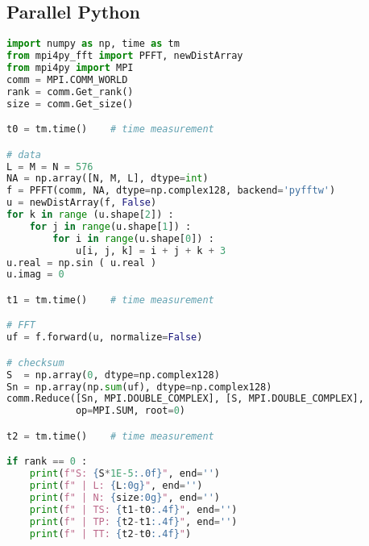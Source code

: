 \subsection{Parallel Python}
\begin{lstlisting}[language=Python, caption={Parallel Python implementation of the FFT test case.}]
import numpy as np, time as tm
from mpi4py_fft import PFFT, newDistArray
from mpi4py import MPI
comm = MPI.COMM_WORLD
rank = comm.Get_rank()
size = comm.Get_size()

t0 = tm.time()    # time measurement

# data
L = M = N = 576
NA = np.array([N, M, L], dtype=int)
f = PFFT(comm, NA, dtype=np.complex128, backend='pyfftw')
u = newDistArray(f, False)
for k in range (u.shape[2]) :
    for j in range(u.shape[1]) :
        for i in range(u.shape[0]) :
            u[i, j, k] = i + j + k + 3
u.real = np.sin ( u.real )
u.imag = 0

t1 = tm.time()    # time measurement

# FFT
uf = f.forward(u, normalize=False)

# checksum
S  = np.array(0, dtype=np.complex128)
Sn = np.array(np.sum(uf), dtype=np.complex128)
comm.Reduce([Sn, MPI.DOUBLE_COMPLEX], [S, MPI.DOUBLE_COMPLEX],
            op=MPI.SUM, root=0)

t2 = tm.time()    # time measurement

if rank == 0 :
    print(f"S: {S*1E-5:.0f}", end='')
    print(f" | L: {L:0g}", end='')
    print(f" | N: {size:0g}", end='')
    print(f" | TS: {t1-t0:.4f}", end='')
    print(f" | TP: {t2-t1:.4f}", end='')
    print(f" | TT: {t2-t0:.4f}")
\end{lstlisting}




